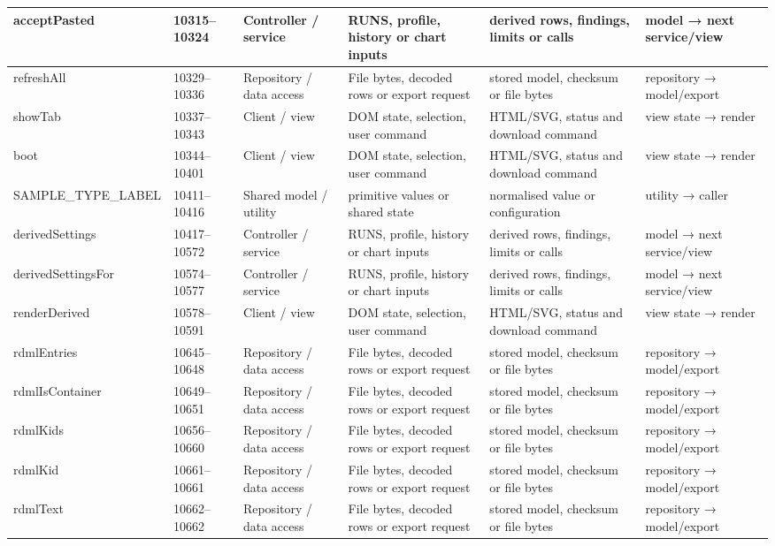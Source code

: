 \begin{landscape}
\begin{longtable}{@{}p{3.2cm}p{1.45cm}p{2.7cm}p{4.0cm}p{4.0cm}p{3.0cm}@{}}
acceptPasted & 10315--10324 & Controller / service & RUNS, profile, history or chart inputs & derived rows, findings, limits or calls & model → next service/view \\\hline
refreshAll & 10329--10336 & Repository / data access & File bytes, decoded rows or export request & stored model, checksum or file bytes & repository → model/export \\\hline
showTab & 10337--10343 & Client / view & DOM state, selection, user command & HTML/SVG, status and download command & view state → render \\\hline
boot & 10344--10401 & Client / view & DOM state, selection, user command & HTML/SVG, status and download command & view state → render \\\hline
SAMPLE\_TYPE\_LABEL & 10411--10416 & Shared model / utility & primitive values or shared state & normalised value or configuration & utility → caller \\\hline
derivedSettings & 10417--10572 & Controller / service & RUNS, profile, history or chart inputs & derived rows, findings, limits or calls & model → next service/view \\\hline
derivedSettingsFor & 10574--10577 & Controller / service & RUNS, profile, history or chart inputs & derived rows, findings, limits or calls & model → next service/view \\\hline
renderDerived & 10578--10591 & Client / view & DOM state, selection, user command & HTML/SVG, status and download command & view state → render \\\hline
rdmlEntries & 10645--10648 & Repository / data access & File bytes, decoded rows or export request & stored model, checksum or file bytes & repository → model/export \\\hline
rdmlIsContainer & 10649--10651 & Repository / data access & File bytes, decoded rows or export request & stored model, checksum or file bytes & repository → model/export \\\hline
rdmlKids & 10656--10660 & Repository / data access & File bytes, decoded rows or export request & stored model, checksum or file bytes & repository → model/export \\\hline
rdmlKid & 10661--10661 & Repository / data access & File bytes, decoded rows or export request & stored model, checksum or file bytes & repository → model/export \\\hline
rdmlText & 10662--10662 & Repository / data access & File bytes, decoded rows or export request & stored model, checksum or file bytes & repository → model/export \\\hline

\end{longtable}
\end{landscape}
